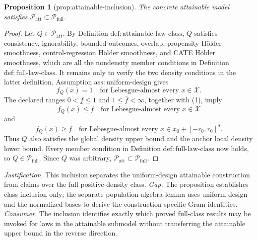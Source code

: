 \documentclass{article}
\newtheorem{proposition}{Proposition}
\begin{document}
\begin{proposition}[prop:attainable-inclusion]\label{prop:attainable-inclusion}
The concrete attainable model satisfies \(\mathcal P_{\mathrm{att}}\subset\mathcal P_{\mathrm{full}}\).
\end{proposition}
\begin{proof}
Let \(Q\in\mathcal P_{\mathrm{att}}\).  By Definition
\(\mathrm{def{:}attainable\text{-}law\text{-}class}\), \(Q\) satisfies
consistency, ignorability, bounded outcomes, overlap, propensity H\"older
smoothness, control-regression H\"older smoothness, and CATE H\"older
smoothness, which are all the nondensity member conditions in Definition
\(\mathrm{def{:}full\text{-}law\text{-}class}\).  It remains only to verify
the two density conditions in the latter definition.  Assumption
\(\mathrm{ass{:}uniform\text{-}design}\) gives
\[
 f_Q(x)=1
 \quad\text{for Lebesgue-almost every }x\in\mathcal X.
\tag{1}
\]
The declared ranges \(0<\underline f\le1\) and
\(1\le\overline f<\infty\), together with (1), imply
\[
 f_Q(x)\le\overline f
 \quad\text{for Lebesgue-almost every }x\in\mathcal X
\tag{2}
\]
and
\[
 f_Q(x)\ge\underline f
 \quad\text{for Lebesgue-almost every }
 x\in x_0+[-r_0,r_0]^d.
\tag{3}
\]
Thus \(Q\) also satisfies the global density upper bound and the anchor
local density lower bound.  Every member condition in Definition
\(\mathrm{def{:}full\text{-}law\text{-}class}\) now holds, so
\(Q\in\mathcal P_{\mathrm{full}}\).  Since \(Q\) was arbitrary,
\(\mathcal P_{\mathrm{att}}\subset\mathcal P_{\mathrm{full}}\).
\end{proof}
\par\smallskip\noindent \textit{Justification.} This inclusion separates the uniform-design attainable construction from claims over the full positive-density class. \textit{Gap.} The proposition establishes class inclusion only; the separate population-algebra lemma uses uniform design and the normalized bases to derive the construction-specific Gram identities. \textit{Consumer.} The inclusion identifies exactly which proved full-class results may be invoked for laws in the attainable submodel without transferring the attainable upper bound in the reverse direction.
\end{document}
